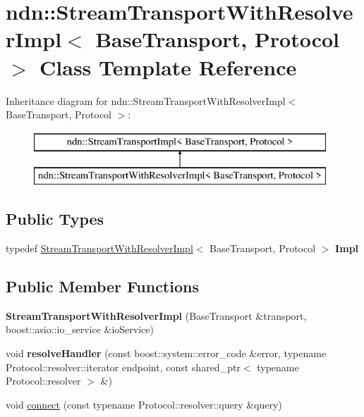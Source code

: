 \hypertarget{classndn_1_1StreamTransportWithResolverImpl}{}\section{ndn\+:\+:Stream\+Transport\+With\+Resolver\+Impl$<$ Base\+Transport, Protocol $>$ Class Template Reference}
\label{classndn_1_1StreamTransportWithResolverImpl}
Inheritance diagram for ndn\+:\+:Stream\+Transport\+With\+Resolver\+Impl$<$ Base\+Transport, Protocol $>$\+:\begin{figure}[H]
\begin{center}
\leavevmode
\includegraphics[height=2.000000cm]{classndn_1_1StreamTransportWithResolverImpl}
\end{center}
\end{figure}
\subsection*{Public Types}
\begin{DoxyCompactItemize}
\item 
typedef \hyperlink{classndn_1_1StreamTransportWithResolverImpl}{Stream\+Transport\+With\+Resolver\+Impl}$<$ Base\+Transport, Protocol $>$ {\bfseries Impl}\hypertarget{classndn_1_1StreamTransportWithResolverImpl_aef9da9d604814af14f35bbe2623cf92e}{}\label{classndn_1_1StreamTransportWithResolverImpl_aef9da9d604814af14f35bbe2623cf92e}

\end{DoxyCompactItemize}
\subsection*{Public Member Functions}
\begin{DoxyCompactItemize}
\item 
{\bfseries Stream\+Transport\+With\+Resolver\+Impl} (Base\+Transport \&transport, boost\+::asio\+::io\+\_\+service \&io\+Service)\hypertarget{classndn_1_1StreamTransportWithResolverImpl_a22c27efd03d9e7255f65cce9159b9a31}{}\label{classndn_1_1StreamTransportWithResolverImpl_a22c27efd03d9e7255f65cce9159b9a31}

\item 
void {\bfseries resolve\+Handler} (const boost\+::system\+::error\+\_\+code \&error, typename Protocol\+::resolver\+::iterator endpoint, const shared\+\_\+ptr$<$ typename Protocol\+::resolver $>$ \&)\hypertarget{classndn_1_1StreamTransportWithResolverImpl_ae190a441e648561398f7a66d4387d4c8}{}\label{classndn_1_1StreamTransportWithResolverImpl_ae190a441e648561398f7a66d4387d4c8}

\item 
void \hyperlink{classndn_1_1StreamTransportWithResolverImpl_a0b7756fd20a988d55620427334aa0eb2}{connect} (const typename Protocol\+::resolver\+::query \&query)
\end{DoxyCompactItemize}
